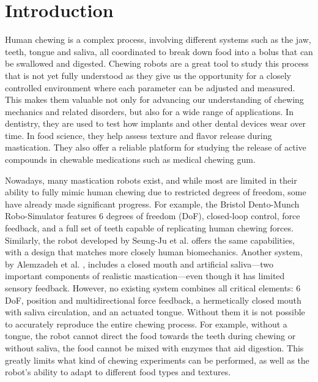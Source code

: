 \section{Introduction}


Human chewing is a complex process, involving different systems such as the jaw, teeth, tongue and saliva, all coordinated to break down food into 
a bolus that can be swallowed and digested. Chewing robots are a great tool to study this process that is not yet fully understood as they give us the opportunity 
for a closely controlled environment where each parameter can be adjusted and measured. This makes them valuable not only for advancing our understanding of 
chewing mechanics and related disorders, but also for a wide range of applications. In dentistry, they are used to test how implants and other dental devices
 wear over time. In food science, they help assess texture and flavor release during mastication. They also offer a reliable platform for studying the release of 
 active compounds in chewable medications such as medical chewing gum.

Nowadays, many mastication robots exist, and while most are limited in their ability to fully mimic human chewing due to restricted degrees of freedom, 
some have already made significant progress. For example, the Bristol Dento-Munch Robo-Simulator \cite{BristolChewingRobot} features 6 degrees of freedom 
(DoF), closed-loop control, force feedback, and a full set of teeth capable of replicating human chewing forces. Similarly, the robot developed by Seung-Ju 
et al. \cite{ChewingRobotLinearActuator} offers the same capabilities, with a design that matches more closely human biomechanics. Another system, by Alemzadeh 
et al. \cite{ChewingRobotGums}, includes a closed mouth and artificial saliva—two important components of realistic mastication—even though it has limited 
sensory feedback. However, no existing system combines all critical elements: 6 DoF, position and multidirectional force feedback, a hermetically closed 
mouth with saliva circulation, and an actuated tongue. Without them it is not possible to accurately reproduce the entire chewing process. For example, without 
a tongue, the robot cannot direct the food towards the teeth during chewing or without saliva, the food cannot be mixed with enzymes that aid digestion. This greatly 
limits what kind of chewing experiments can be performed, as well as the robot's ability to adapt to different food types and textures.

